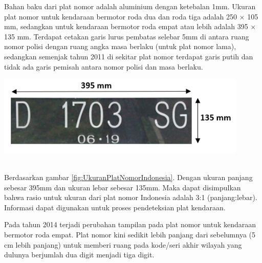 \noindent Bahan baku dari plat nomor adalah aluminium dengan ketebalan 1mm. Ukuran plat nomor untuk kendaraan bermotor roda dua dan roda tiga adalah 250 $\times$ 105 mm, sedangkan untuk kendaraan bermotor roda empat atau lebih adalah 395 $\times$ 135 mm. Terdapat cetakan garis lurus pembatas selebar 5mm di antara ruang nomor polisi dengan ruang angka masa berlaku (untuk plat nomor lama), sedangkan semenjak tahun 2011 di sekitar plat nomor terdapat garis putih dan tidak ada garis pemisah antara nomor polisi dan masa berlaku.

\begin{adjustbox}{width=1\textwidth}
	\noindent\begin{minipage}{\linewidth}
		\centering\includegraphics[width=12cm]{images/RasioPlat.png}
		\label{fig:UkuranPlatNomorIndonesia}
	\end{minipage}
\end{adjustbox}\\

\noindent Berdasarkan gambar \ref{fig:UkuranPlatNomorIndonesia}. Dengan ukuran panjang sebesar 395mm dan ukuran lebar sebesar 135mm. Maka dapat disimpulkan bahwa rasio untuk ukuran dari plat nomor Indonesia adalah 3:1 (panjang:lebar). Informasi dapat digunakan untuk proses pendeteksian plat kendaraan.

\noindent Pada tahun 2014 terjadi perubahan tampilan pada plat nomor untuk kendaraan bermotor roda empat. Plat nomor kini sedikit lebih panjang dari sebelumnya (5 cm lebih panjang) untuk memberi ruang pada kode/seri akhir wilayah yang dulunya berjumlah dua digit menjadi tiga digit.\\

